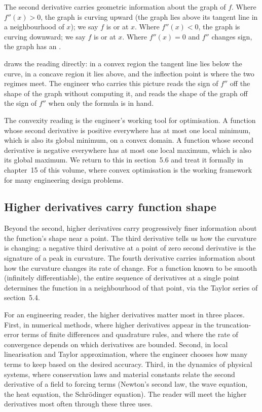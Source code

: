 The second derivative carries geometric information about the
graph of $f$. Where $f''(x) > 0$, the graph is curving upward (the
graph lies above its tangent line in a neighbourhood of $x$); we
say $f$ is  or  at $x$. Where
$f''(x) < 0$, the graph is curving downward; we say $f$ is
 or  at $x$. Where $f''(x)
= 0$ and $f''$ changes sign, the graph has an .



 draws the reading directly: in a
convex region the tangent line lies below the curve, in a concave
region it lies above, and the inflection point is where the two
regimes meet. The engineer who carries this picture reads the sign
of $f''$ off the shape of the graph without computing it, and reads
the shape of the graph off the sign of $f''$ when only the formula
is in hand.

The convexity reading is the engineer's working tool for
optimisation. A function whose second derivative is positive
everywhere has at most one local minimum, which is also its
global minimum, on a convex domain. A function whose second
derivative is negative everywhere has at most one local maximum,
which is also its global maximum. We return to this in
section~5.6 and treat it formally in chapter~15 of this volume,
where convex optimisation is the working framework for many
engineering design problems.

\subsection{Higher derivatives carry function shape}

Beyond the second, higher derivatives carry progressively finer
information about the function's shape near a point. The third
derivative tells us how the curvature is changing: a negative
third derivative at a point of zero second derivative is the
signature of a peak in curvature. The fourth derivative carries
information about how the curvature changes its rate of change.
For a function known to be smooth (infinitely differentiable),
the entire sequence of derivatives at a single point determines
the function in a neighbourhood of that point, via the Taylor
series of section~5.4.

For an engineering reader, the higher derivatives matter most in
three places. First, in numerical methods, where higher
derivatives appear in the truncation-error terms of finite
differences and quadrature rules, and where the rate of
convergence depends on which derivatives are bounded. Second, in
local linearisation and Taylor approximation, where the engineer
chooses how many terms to keep based on the desired accuracy.
Third, in the dynamics of physical systems, where conservation
laws and material constants relate the second derivative of a
field to forcing terms (Newton's second law, the wave equation,
the heat equation, the Schrödinger equation). The reader will
meet the higher derivatives most often through these three uses.

